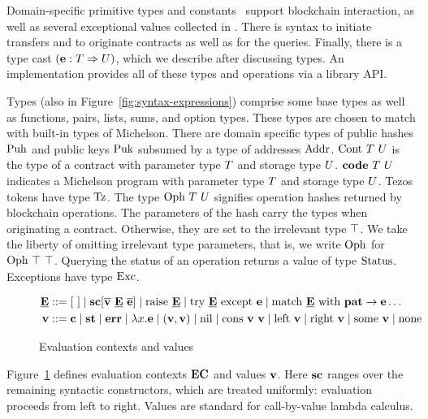 \documentclass[runningheads]{llncs}
\begin{document}
Domain-specific primitive types and constants \CONSTANT\ support blockchain
interaction, as well as several exceptional values collected in \ERROR.
There is syntax to initiate transfers and to originate contracts as
well as for the queries. Finally, there is a type cast
$(\textbf{e} : T \Rightarrow U)$, which we describe after discussing types. An
implementation provides all of these types and operations via a library API.

Types (also in Figure~\ref{fig:syntax-expressions}) comprise some base types as well as 
functions, pairs, lists, sums, and option types. These types are
chosen to match with built-in types of Michelson. 
There are domain specific types of public hashes $\text{Puh}$ and public keys $\text{Puk}$ subsumed by
a type of addresses $\text{Addr}$. $\text{Cont}\ T\ U$ is the type of
a contract with parameter type $T$ and storage type $U$. $\textbf{code}\ T\ U$
indicates a Michelson program with parameter type $T$ and storage
type $U$. Tezos tokens have type $\text{Tz}$. The type $\text{Oph}\ T\
U$ signifies operation hashes
returned by blockchain operations. The parameters of the hash carry
the types when originating a contract. Otherwise, they are set to the
irrelevant type $\top$. We take the liberty of omitting irrelevant
type parameters, that is, we write $\text{Oph}$ for $\TOPH\ \TNO\ \TNO$.
Querying the status of an operation
returns a value of type $\text{Status}$. Exceptions have type
$\text{Exc}$. 

\begin{figure}[tp]
\begin{align*}
  \ECN{} & :: = \ECHOLE \mid \SC[\overline\VAL\ \ECN{}\ \overline\EXPR] \mid \RAISE\ \ECN{} \mid \TRY\ \ECN{}\ \EXCEPT\ \EXPR
  \mid \MATCH\ \ECN{}\ \WITH\ \PATTERN\to\EXPR \dots
  \\
  \VAL & ::= \CONSTANT \mid \STATUS \mid \ERROR \mid \lambda x.\EXPR \mid(\VAL, \VAL) \mid
         \NIL \mid \CONS\ \VAL\ \VAL \mid \LEFT\ \VAL \mid \RIGHT\
         \VAL \mid \SOME\ \VAL\mid \NONE
\end{align*}
  \caption{Evaluation contexts and values}
  \label{fig:evaluation-contexts-values}
\end{figure}
Figure~\ref{fig:evaluation-contexts-values} defines evaluation
contexts $\textbf{EC}$ and values $\textbf{v}$.
Here $\textbf{sc}$ ranges over the remaining syntactic constructors, which are
treated uniformly: evaluation proceeds from left to right. Values are
standard for call-by-value lambda calculus.
\end{document}
